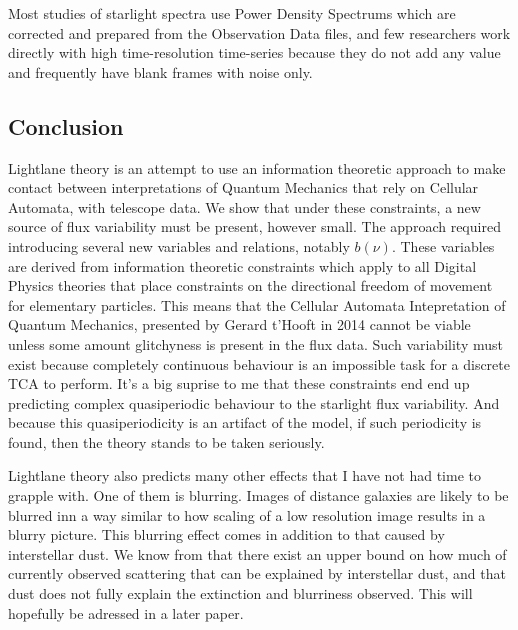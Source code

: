 \documentclass[notitlepage]{article}
\begin{document}
Most studies of starlight spectra use Power Density Spectrums which are corrected and prepared from the Observation Data files, and few researchers work directly with high time-resolution time-series because they do not add any value and frequently have blank frames with noise only. 



\subsection{Conclusion}
Lightlane theory is an attempt to use an information theoretic approach to make contact between interpretations of Quantum Mechanics that rely on Cellular Automata, with telescope data. We show that under these constraints, a new source of flux variability must be present, however small. The approach required introducing several new variables and relations, notably $b(\nu)$. These variables are derived from information theoretic constraints which apply to all Digital Physics theories that place constraints on the directional freedom of movement for elementary particles. This means that the Cellular Automata Intepretation of Quantum Mechanics, presented by Gerard t'Hooft in 2014 \citep{hooft2014cellular} cannot be viable unless some amount  glitchyness is present in the flux data. Such variability must exist because completely continuous behaviour is an impossible task for a discrete TCA to perform. It's a big suprise to me that these constraints end end up  predicting complex quasiperiodic behaviour to the starlight flux variability. And because this quasiperiodicity is an artifact of the model, if such periodicity is found, then the theory stands to be taken seriously.

Lightlane theory also predicts many other effects that I have not had time to grapple with. One of them is blurring. Images of distance galaxies are likely to be blurred inn a way similar to how scaling of a low resolution image results in a blurry picture. This blurring effect comes in addition to that caused by interstellar dust. We know from \citep{2021dustdraine} that there exist an upper bound on how much of currently observed scattering that can be explained by interstellar dust, and that dust does not fully explain the extinction and blurriness observed. This will hopefully be adressed in a later paper.






\end{document}
